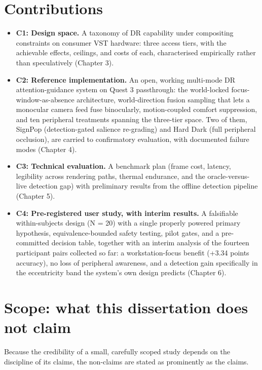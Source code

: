 \section{Contributions}

\begin{itemize}
\item \textbf{C1: Design space.} A taxonomy of DR capability under compositing constraints on consumer VST
  hardware: three access tiers, with the achievable effects, ceilings, and costs of each,
  characterised empirically rather than speculatively (Chapter 3).
\item \textbf{C2: Reference implementation.} An open, working multi-mode DR attention-guidance system on
  Quest 3 passthrough: the world-locked focus-window-as-absence architecture, world-direction fusion
  sampling that lets a monocular camera feed fuse binocularly, motion-coupled comfort suppression,
  and ten peripheral treatments spanning the three-tier space. Two of them, SignPop (detection-gated
  salience re-grading) and Hard Dark (full peripheral occlusion), are carried to confirmatory
  evaluation, with documented failure modes (Chapter 4).
\item \textbf{C3: Technical evaluation.} A benchmark plan (frame cost, latency, legibility across rendering
  paths, thermal endurance, and the oracle-versus-live detection gap) with preliminary results from
  the offline detection pipeline (Chapter 5).
\item \textbf{C4: Pre-registered user study, with interim results.} A falsifiable within-subjects design
  (N = 20) with a single properly powered primary hypothesis, equivalence-bounded safety testing,
  pilot gates, and a pre-committed decision table, together with an interim analysis of the fourteen
  participant pairs collected so far: a workstation-focus benefit (+3.34 points accuracy), no loss of
  peripheral awareness, and a detection gain specifically in the eccentricity band the system's own
  design predicts (Chapter 6).
\end{itemize}

\section{Scope: what this dissertation does not claim}

Because the credibility of a small, carefully scoped study depends on the discipline of its claims,
the non-claims are stated as prominently as the claims.

